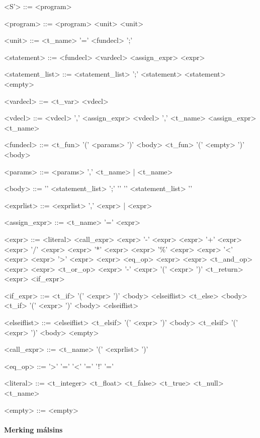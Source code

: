 \documentclass{article}
\begin{document}
\begin{grammar}

<S'> ::= <program>

<program> ::= <program> <unit>
\alt <unit>

<unit> ::= <t\_name> '=' <fundecl> ';'

<statement> ::= <fundecl>
\alt <vardecl>
\alt <assign\_expr>
\alt <expr>

<statement\_list> ::= <statement\_list> ';' <statement>
\alt <statement>
\alt <empty>

<vardecl> ::= <t\_var> <vdecl>

<vdecl> ::= <vdecl> ',' <assign\_expr>
\alt <vdecl> ',' <t\_name>
\alt <assign\_expr>
\alt <t\_name>

<fundecl> ::= <t\_fun> '(' <params> ')' <body>
\alt <t\_fun> '(' <empty> ')' <body>

<params> ::= <params> ',' <t\_name> | <t\_name>

<body> ::= '{' <statement\_list> ';' '}'
\alt '{' <statement\_list> '}'

<exprlist> ::= <exprlist> ',' <expr> | <expr>

<assign\_expr> ::= <t\_name> '=' <expr>

<expr> ::= <literal>
\alt <call\_expr>
\alt <expr> '-' <expr>
\alt <expr> '+' <expr>
\alt <expr> '/' <expr>
\alt <expr> '*' <expr>
\alt <expr> '\%' <expr>
\alt <expr> '\textless' <expr>
\alt <expr> '\textgreater' <expr>
\alt <expr> <eq\_op> <expr>
\alt <expr> <t\_and\_op> <expr>
\alt <expr> <t\_or\_op> <expr>
\alt '-' <expr>
\alt '(' <expr> ')'
\alt <t\_return> <expr>
\alt <if\_expr>

<if\_expr> ::= <t\_if> '(' <expr> ')' <body> <elseiflist> <t\_else> <body>
\alt <t\_if> '(' <expr> ')' <body> <elseiflist>

<elseiflist> ::= <elseiflist> <t\_elsif> '(' <expr> ')' <body>
\alt <t\_elsif> '(' <expr> ')' <body>
\alt <empty>

<call\_expr> ::= <t\_name> '(' <exprlist> ')'

<eq\_op> ::= '\textgreater' '='
\alt '\textless' '='
\alt '!' '='

<literal> ::= <t\_integer>
\alt <t\_float>
\alt <t\_false>
\alt <t\_true>
\alt <t\_null>
\alt <t\_name>

<empty> ::= <empty>

\end{grammar}

\clearpage
\paragraph{{\Large Merking málsins}}
\end{document}

